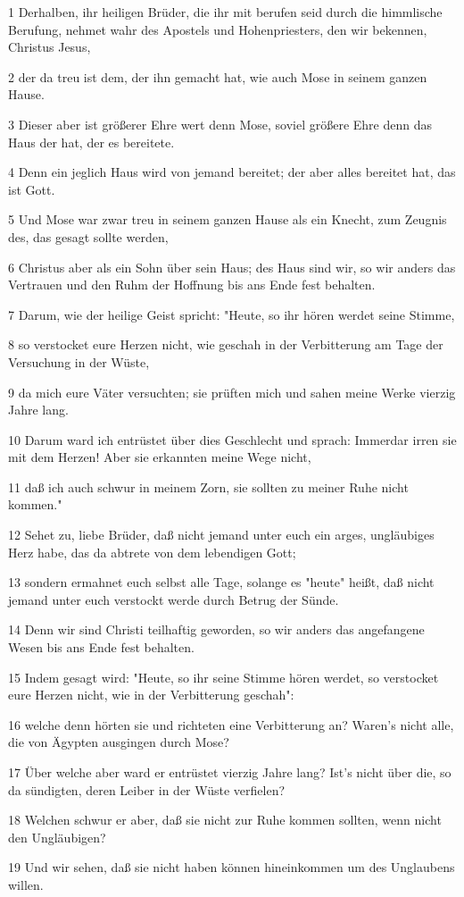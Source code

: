 \par 1 Derhalben, ihr heiligen Brüder, die ihr mit berufen seid durch die himmlische Berufung, nehmet wahr des Apostels und Hohenpriesters, den wir bekennen, Christus Jesus,
\par 2 der da treu ist dem, der ihn gemacht hat, wie auch Mose in seinem ganzen Hause.
\par 3 Dieser aber ist größerer Ehre wert denn Mose, soviel größere Ehre denn das Haus der hat, der es bereitete.
\par 4 Denn ein jeglich Haus wird von jemand bereitet; der aber alles bereitet hat, das ist Gott.
\par 5 Und Mose war zwar treu in seinem ganzen Hause als ein Knecht, zum Zeugnis des, das gesagt sollte werden,
\par 6 Christus aber als ein Sohn über sein Haus; des Haus sind wir, so wir anders das Vertrauen und den Ruhm der Hoffnung bis ans Ende fest behalten.
\par 7 Darum, wie der heilige Geist spricht: "Heute, so ihr hören werdet seine Stimme,
\par 8 so verstocket eure Herzen nicht, wie geschah in der Verbitterung am Tage der Versuchung in der Wüste,
\par 9 da mich eure Väter versuchten; sie prüften mich und sahen meine Werke vierzig Jahre lang.
\par 10 Darum ward ich entrüstet über dies Geschlecht und sprach: Immerdar irren sie mit dem Herzen! Aber sie erkannten meine Wege nicht,
\par 11 daß ich auch schwur in meinem Zorn, sie sollten zu meiner Ruhe nicht kommen."
\par 12 Sehet zu, liebe Brüder, daß nicht jemand unter euch ein arges, ungläubiges Herz habe, das da abtrete von dem lebendigen Gott;
\par 13 sondern ermahnet euch selbst alle Tage, solange es "heute" heißt, daß nicht jemand unter euch verstockt werde durch Betrug der Sünde.
\par 14 Denn wir sind Christi teilhaftig geworden, so wir anders das angefangene Wesen bis ans Ende fest behalten.
\par 15 Indem gesagt wird: "Heute, so ihr seine Stimme hören werdet, so verstocket eure Herzen nicht, wie in der Verbitterung geschah":
\par 16 welche denn hörten sie und richteten eine Verbitterung an? Waren's nicht alle, die von Ägypten ausgingen durch Mose?
\par 17 Über welche aber ward er entrüstet vierzig Jahre lang? Ist's nicht über die, so da sündigten, deren Leiber in der Wüste verfielen?
\par 18 Welchen schwur er aber, daß sie nicht zur Ruhe kommen sollten, wenn nicht den Ungläubigen?
\par 19 Und wir sehen, daß sie nicht haben können hineinkommen um des Unglaubens willen.

